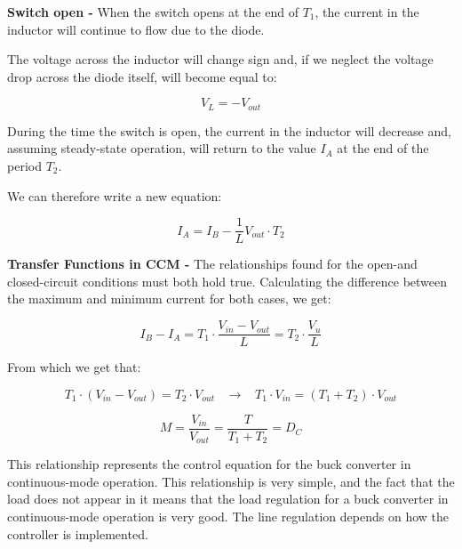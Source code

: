 \documentclass[../main.tex]{subfiles}
\begin{document}
\textbf{Switch open -} When the switch opens at the end of $T_1$, the current in the inductor will continue to flow due to the diode. 

The voltage across the inductor will change sign and, if we neglect the voltage drop across the diode itself, will become equal to:

\begin{equation}
	V_L = -V_{out}
\end{equation}

During the time the switch is open, the current in the inductor will decrease and, assuming steady-state operation, will return to the value $I_A$ at the end of the period $T_2$. 

We can therefore write a new equation:

\begin{equation}
	I_A = I_B - \frac{1}{L} V_{out} \cdot T_2
\end{equation}


\textbf{Transfer Functions in CCM -} The relationships found for the open-and closed-circuit conditions must both hold true. 
Calculating the difference between the maximum and minimum current for both cases, we get:

\begin{equation}
	I_B - I_A = T_1 \cdot \frac{V_{in} - V_{out}}{L} = T_2 \cdot \frac{V_u}{L}
\end{equation}

From which we get that:

\begin{equation}
	T_1 \cdot (V_{in} - V_{out}) = T_2 \cdot V_{out} \hspace{10pt} \longrightarrow \hspace{10pt} T_1 \cdot V_{in} = (T_1 + T_2) \cdot V_{out}
\end{equation}

\begin{equation}
	M = \frac{V_{in}}{V_{out}} = \frac{T}{T_1 + T_2} = D_C
\end{equation}

This relationship represents the control equation for the buck converter in continuous-mode operation. 
This relationship is very simple, and the fact that the load does not appear in it means that the load regulation for a buck converter in continuous-mode operation is very good. The line regulation depends on how the controller is implemented.\\
\end{document}
